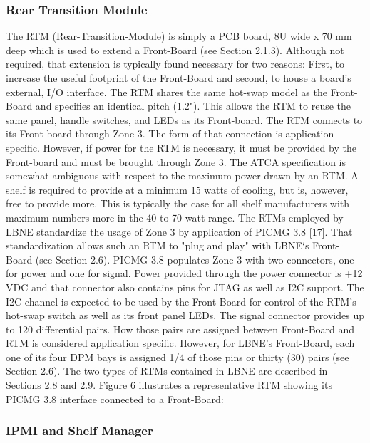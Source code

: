 \subsubsection{Rear Transition Module}
\label{sec:rtm}
The RTM (Rear-Transition-Module) is simply a PCB board, 8U wide x 70 mm deep which is used to extend a Front-Board (see Section 2.1.3). Although not required, that extension is typically found necessary for two reasons: First, to increase the useful footprint of the Front-Board and second, to house a board's external, I/O interface. The RTM shares the same hot-swap model as the Front-Board and specifies an identical pitch (1.2"). This allows the RTM to reuse the same panel, handle switches, and LEDs as its Front-board. The RTM connects to its Front-board through Zone 3. The form of that connection is application specific. However, if power for the RTM is necessary, it must be provided by the Front-board and must be brought through Zone 3. The ATCA specification is somewhat ambiguous with respect to the maximum power drawn by an RTM. A shelf is required to provide at a minimum 15 watts of cooling, but is, however, free to provide more. This is typically the case for all shelf manufacturers with maximum numbers more in the 40 to 70 watt range.
The RTMs employed by LBNE standardize the usage of Zone 3 by application of PICMG 3.8 [17]. That standardization allows such an RTM to "plug and play" with LBNE‘s Front-Board (see Section 2.6). PICMG 3.8 populates Zone 3 with two connectors, one for power and one for signal. Power provided through the power connector is +12 VDC and that connector also contains pins for JTAG as well as I2C support. The I2C channel is expected to be used by the Front-Board for control of the RTM's hot-swap switch as well as its front panel LEDs.
The signal connector provides up to 120 differential pairs. How those pairs are assigned between Front-Board and RTM is considered application specific. However, for LBNE's Front-Board, each one of its four DPM bays is assigned 1/4 of those pins or thirty (30) pairs (see Section 2.6).
The two types of RTMs contained in LBNE are described in Sections 2.8 and 2.9. Figure 6 illustrates a representative RTM showing its PICMG 3.8 interface connected to a Front-Board:

\subsubsection{IPMI and Shelf Manager}


